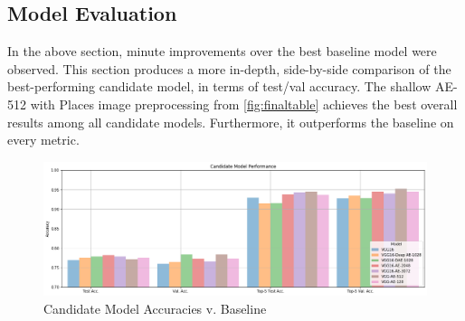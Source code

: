 \subsection{Model Evaluation}
In the above section, minute improvements over the best baseline model were observed. 
This section produces a more in-depth, side-by-side comparison of the best-performing candidate model, in terms of test/val accuracy.
The shallow AE-512 with Places image preprocessing from \autoref{fig:finaltable} achieves the best overall results among all candidate models. 
Furthermore, it outperforms the baseline on every metric.

\begin{figure}[H]
  \centering
    \includegraphics[width=\textwidth]{pictures/plots/final_cand_perf}
    \caption{Candidate Model Accuracies v. Baseline}
    \label{fig:candidates}
\end{figure}

